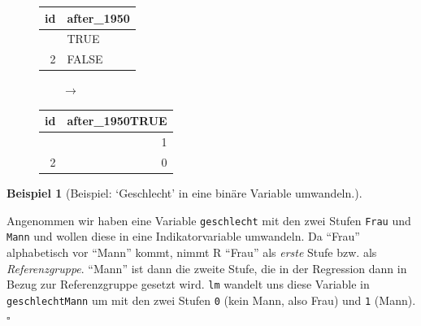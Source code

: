 \documentclass[
  letterpaper,
]{scrbook}
\theoremstyle{definition}
\newtheorem{example}{Beispiel}[chapter]
\theoremstyle{definition}
\theoremstyle{definition}
\theoremstyle{remark}
\begin{document}
\begin{figure}

\begin{minipage}{0.40\linewidth}

\begin{longtable}[]{@{}rl@{}}
\toprule\noalign{}
id & after\_1950 \\
\midrule\noalign{}
\endhead
\bottomrule\noalign{}
\endlastfoot
1 & TRUE \\
2 & FALSE \\
\end{longtable}

\end{minipage}%
%
\begin{minipage}{0.20\linewidth}
\(\qquad \rightarrow\)\end{minipage}%
%
\begin{minipage}{0.40\linewidth}

\begin{longtable}[]{@{}rr@{}}
\toprule\noalign{}
id & after\_1950TRUE \\
\midrule\noalign{}
\endhead
\bottomrule\noalign{}
\endlastfoot
1 & 1 \\
2 & 0 \\
\end{longtable}

\end{minipage}%

\end{figure}%

\begin{example}[Beispiel: `Geschlecht' in eine binäre Variable
umwandeln.]\protect\hypertarget{exm-bin-trans}{}\label{exm-bin-trans}

Angenommen wir haben eine Variable \texttt{geschlecht} mit den zwei
Stufen \texttt{Frau} und \texttt{Mann} und wollen diese in eine
Indikatorvariable umwandeln. Da ``Frau'' alphabetisch vor ``Mann''
kommt, nimmt R ``Frau'' als \emph{erste} Stufe bzw. als
\emph{Referenzgruppe}. ``Mann'' ist dann die zweite Stufe, die in der
Regression dann in Bezug zur Referenzgruppe gesetzt wird. \texttt{lm}
wandelt uns diese Variable in \texttt{geschlechtMann} um mit den zwei
Stufen \texttt{0} (kein Mann, also Frau) und \texttt{1}
(Mann).\(\square\)

\end{example}
\end{document}
